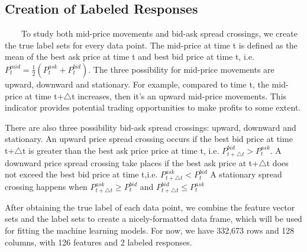 \documentclass[11pt]{article}
\begin{document}
\subsection{Creation of Labeled Responses}
\ \ \ \ To study both mid-price movements and bid-ask spread crossings, we create the true label sets for every data point. The mid-price at time t is defined as the mean of the best ask price at time t and best bid price at time t, i.e. $P_{t}^{mid}=\frac{1}{2}(P_{t}^{ask}+P_{t}^{bid})$. The three possibility for mid-price movements are upward, downward and stationary. For example, compared to time t, the mid-price at time t+$\bigtriangleup$t increases, then it's an upward mid-price movements. This indicator provides potential trading opportunities to make profits to some extent. 
\par 
There are also three possibility bid-ask spread crossings: upward, downward and stationary. An upward price spread crossing occurs if the best bid price at time t+$\bigtriangleup$t is greater than the best ask price price at time t, i.e. $P_{t+\bigtriangleup{t}}^{bid} > P_{t}^{ask}$. A downward price spread crossing take places if the best ask price at t+$\bigtriangleup$t does not exceed the best bid price at time t,i.e. $P_{t+\bigtriangleup{t}}^{ask} < P_{t}^{bid}$ A stationary spread crossing happens when $P_{t+\bigtriangleup{t}}^{ask} \ge P_{t}^{bid}$ and $P_{t+\bigtriangleup{t}}^{bid} \le P_{t}^{ask}$
\par 
After obtaining the true label of each data point, we combine the feature vector sets and the label sets to create a nicely-formatted data frame, which will be used for fitting the machine learning models. For now, we have 332,673 rows and 128 columns, with 126 features and 2 labeled responses. 
\end{document}
